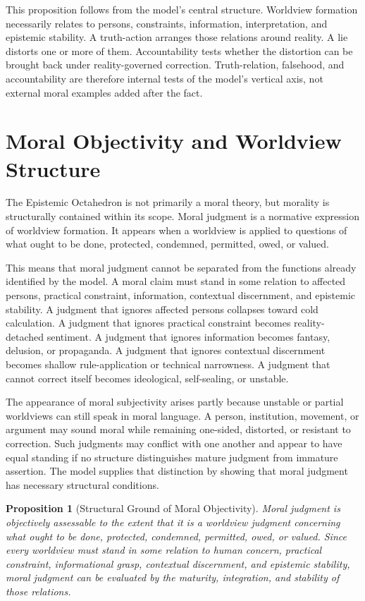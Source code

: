 \documentclass[11pt]{article}
\newtheorem{proposition}{Proposition}
\begin{document}
This proposition follows from the model's central structure. Worldview formation necessarily relates to persons, constraints, information, interpretation, and epistemic stability. A truth-action arranges those relations around reality. A lie distorts one or more of them. Accountability tests whether the distortion can be brought back under reality-governed correction. Truth-relation, falsehood, and accountability are therefore internal tests of the model's vertical axis, not external moral examples added after the fact.

\section{Moral Objectivity and Worldview Structure}

The Epistemic Octahedron is not primarily a moral theory, but morality is structurally contained within its scope. Moral judgment is a normative expression of worldview formation. It appears when a worldview is applied to questions of what ought to be done, protected, condemned, permitted, owed, or valued.

This means that moral judgment cannot be separated from the functions already identified by the model. A moral claim must stand in some relation to affected persons, practical constraint, information, contextual discernment, and epistemic stability. A judgment that ignores affected persons collapses toward cold calculation. A judgment that ignores practical constraint becomes reality-detached sentiment. A judgment that ignores information becomes fantasy, delusion, or propaganda. A judgment that ignores contextual discernment becomes shallow rule-application or technical narrowness. A judgment that cannot correct itself becomes ideological, self-sealing, or unstable.

The appearance of moral subjectivity arises partly because unstable or partial worldviews can still speak in moral language. A person, institution, movement, or argument may sound moral while remaining one-sided, distorted, or resistant to correction. Such judgments may conflict with one another and appear to have equal standing if no structure distinguishes mature judgment from immature assertion. The model supplies that distinction by showing that moral judgment has necessary structural conditions.

\begin{proposition}[Structural Ground of Moral Objectivity]
Moral judgment is objectively assessable to the extent that it is a worldview judgment concerning what ought to be done, protected, condemned, permitted, owed, or valued. Since every worldview must stand in some relation to human concern, practical constraint, informational grasp, contextual discernment, and epistemic stability, moral judgment can be evaluated by the maturity, integration, and stability of those relations.
\end{proposition}
\end{document}
